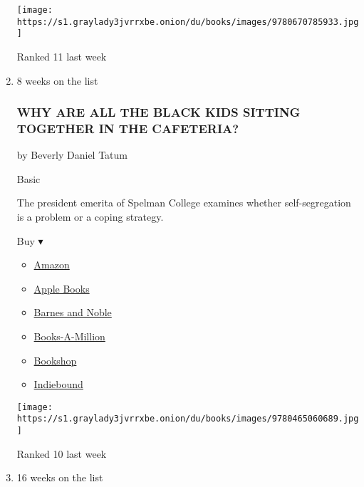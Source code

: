 \begin{enumerate}
  \texttt{[image: https://s1.graylady3jvrrxbe.onion/du/books/images/9780670785933.jpg]}

  Ranked 11 last week
\item
  8 weeks on the list

  \hypertarget{why-are-all-the-black-kids-sitting-together-in-the-cafeteria}{%
  \subsubsection{WHY ARE ALL THE BLACK KIDS SITTING TOGETHER IN THE
  CAFETERIA?}\label{why-are-all-the-black-kids-sitting-together-in-the-cafeteria}}

  by Beverly Daniel Tatum

  Basic

  The president emerita of Spelman College examines whether
  self-segregation is a problem or a coping strategy.

  Buy ▾

  \begin{itemize}
  \tightlist
  \item
    \href{https://www.amazon.com/dp/0465060684?tag=NYTBSREV-20\&tag=NYTBS-20}{Amazon}
  \item
    \href{https://du-gae-books-dot-nyt-du-prd.appspot.com/buy?title=WHY+ARE+ALL+THE+BLACK+KIDS+SITTING+TOGETHER+IN+THE+CAFETERIA\%3F\&author=Beverly+Daniel+Tatum}{Apple
    Books}
  \item
    \href{https://www.anrdoezrs.net/click-7990613-11819508?url=https\%3A\%2F\%2Fwww.barnesandnoble.com\%2Fw\%2F\%3Fean\%3D9780465060689}{Barnes
    and Noble}
  \item
    \href{https://www.anrdoezrs.net/click-7990613-35140?url=https\%3A\%2F\%2Fwww.booksamillion.com\%2Fp\%2FWHY\%2BARE\%2BALL\%2BTHE\%2BBLACK\%2BKIDS\%2BSITTING\%2BTOGETHER\%2BIN\%2BTHE\%2BCAFETERIA\%253F\%2FBeverly\%2BDaniel\%2BTatum\%2F9780465060689}{Books-A-Million}
  \item
    \href{https://bookshop.org/a/3546/9780465060689}{Bookshop}
  \item
    \href{https://www.indiebound.org/book/9780465060689?aff=NYT}{Indiebound}
  \end{itemize}

  \texttt{[image: https://s1.graylady3jvrrxbe.onion/du/books/images/9780465060689.jpg]}

  Ranked 10 last week
\item
  16 weeks on the list

  \hypertarget{ill-be-gone-in-the-dark}{%
}
\end{enumerate}
